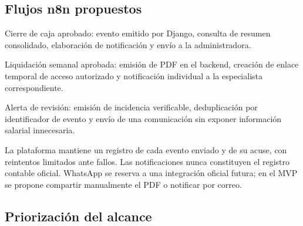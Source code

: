 \subsection{Flujos n8n propuestos}

\begin{vinetas}
\item Cierre de caja aprobado: evento emitido por Django, consulta de resumen consolidado, elaboración de notificación y envío a la administradora.
\item Liquidación semanal aprobada: emisión de PDF en el backend, creación de enlace temporal de acceso autorizado y notificación individual a la especialista correspondiente.
\item Alerta de revisión: emisión de incidencia verificable, deduplicación por identificador de evento y envío de una comunicación sin exponer información salarial innecesaria.
\end{vinetas}

La plataforma mantiene un registro de cada evento enviado y de su acuse, con reintentos limitados ante fallos. Las notificaciones nunca constituyen el registro contable oficial. WhatsApp se reserva a una integración oficial futura; en el MVP se propone compartir manualmente el PDF o notificar por correo.


\subsection{Priorización del alcance}

